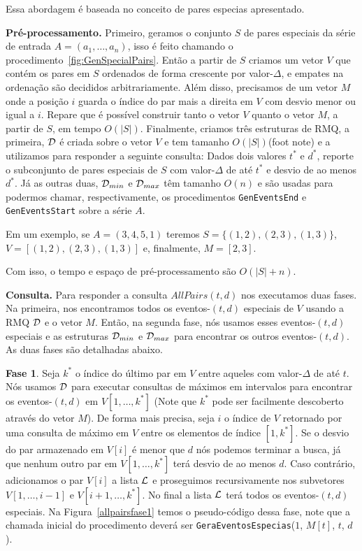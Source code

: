 \documentclass[dissertacao, brazil]{ThesisPUC}
\begin{document}
Essa abordagem é baseada no conceito de pares especias apresentado.

\textbf{Pré-processamento.} Primeiro, geramos o conjunto $S$ de pares especiais da série de entrada $A = (a_1, \ldots, a_n)$,
isso é feito chamando o procedimento~\ref{fig:GenSpecialPairs}. Então a partir de $S$ criamos um vetor $V$ que
contém os pares em $S$ ordenados de forma crescente por valor-$\Delta$, e empates na ordenação são decididos arbitrariamente. 
Além disso, precisamos de um vetor $M$ onde a posição $i$ guarda o índice do par mais a direita em $V$  com desvio menor ou igual a $i$.
Repare que é possível construir tanto o vetor $V$ quanto o vetor $M$, a partir de $S$, em tempo $O(|S|)$.
Finalmente, criamos três estruturas de RMQ, a primeira, ${\cal D}$ é criada sobre o vetor $V$ e tem tamanho 
$O(|S|)$(foot note) e a utilizamos para responder a seguinte consulta: Dados dois valores $t^*$ e $d^*$, 
reporte o subconjunto de pares especiais de $S$ com valor-$\Delta$ de até $t^*$ e desvio de ao menos $d^*$. 
Já as outras duas, ${\cal D}_{min}$ e ${\cal D}_{max}$ têm tamanho $O(n)$ e são usadas para podermos chamar, 
respectivamente, os procedimentos {\tt GenEventsEnd} e {\tt GenEventsStart} sobre a série $A$. 

Em um exemplo, se $A = (3, 4, 5, 1)$ teremos $S = \{(1, 2), (2, 3), (1, 3)\}$, $V = [(1, 2), (2, 3), (1, 3)]$ e, 
finalmente, $M = [2, 3]$. 

Com isso, o tempo e espaço de pré-processamento são $O(|S| + n)$.

\textbf{Consulta.} Para responder a consulta $AllPairs(t, d)$ nos executamos duas fases. Na primeira, 
nos encontramos todos os eventos-$(t,d)$ especiais de $V$ usando a RMQ ${\cal D}$ e o vetor $M$.
Então, na segunda fase, nós usamos esses eventos-$(t,d)$ especiais e as estruturas 
${\cal D}_{min}$ e ${\cal D}_{max}$ para encontrar os outros eventos-$(t,d)$. As duas fases
são detalhadas abaixo.

\textbf{Fase 1}. Seja $k^*$ o índice do último par em $V$ entre aqueles com valor-$\Delta$
de até $t$. Nós usamos ${\cal D}$ para executar consultas de máximos em intervalos para
encontrar os eventos-$(t,d)$ em $V[1, \ldots, k^*]$ (Note que $k^*$ pode ser facilmente
descoberto através do vetor $M$). De forma mais precisa, seja $i$ o índice
de $V$ retornado por uma consulta de máximo em $V$ entre os elementos de
índice $[1, k^*]$. Se o desvio do par armazenado em $V[i]$ é menor que $d$ nós podemos
terminar a busca, já que nenhum outro par em $V[1, \ldots, k^*]$ terá desvio de ao menos $d$.
Caso contrário, adicionamos o par $V[i]$ a lista ${\cal L}$ e proseguimos recursivamente 
nos subvetores $V[1, \ldots, i - 1]$ e $V[i + 1, \ldots, k^*]$. No final a lista ${\cal L}$ terá
todos os eventos-$(t,d)$ especiais. Na Figura~\ref{allpairsfase1} temos o pseudo-código dessa fase,
note que a chamada inicial do procedimento deverá ser {\tt GeraEventosEspecias}($1$, $M[t]$, $t$, $d$).
\end{document}

